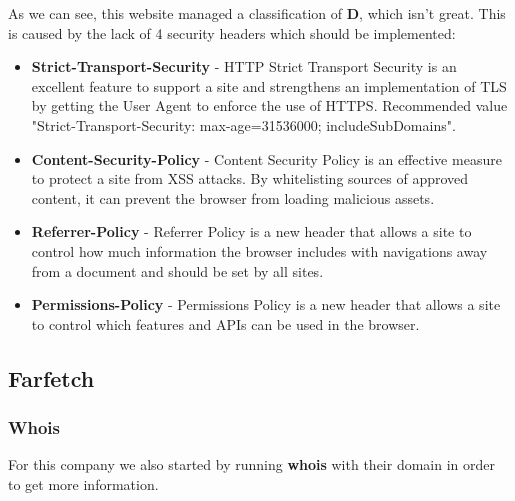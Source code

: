 As we can see, this website managed a classification of \textbf{D}, which isn't great. This is caused by the lack of 4 security headers which should be implemented:

\begin{itemize}
    \item \textbf{Strict-Transport-Security} - HTTP Strict Transport Security is an excellent feature to support a site and strengthens an implementation of TLS by getting the User Agent to enforce the use of HTTPS. Recommended value "Strict-Transport-Security: max-age=31536000; includeSubDomains".
    \item \textbf{Content-Security-Policy} - Content Security Policy is an effective measure to protect a site from XSS attacks. By whitelisting sources of approved content, it can prevent the browser from loading malicious assets.
    \item \textbf{Referrer-Policy} - Referrer Policy is a new header that allows a site to control how much information the browser includes with navigations away from a document and should be set by all sites.
    \item \textbf{Permissions-Policy} - Permissions Policy is a new header that allows a site to control which features and APIs can be used in the browser.
\end{itemize}



\subsection{Farfetch}

\subsubsection{Whois}

For this company we also started by running \textbf{whois} with their domain in order to get more information.

